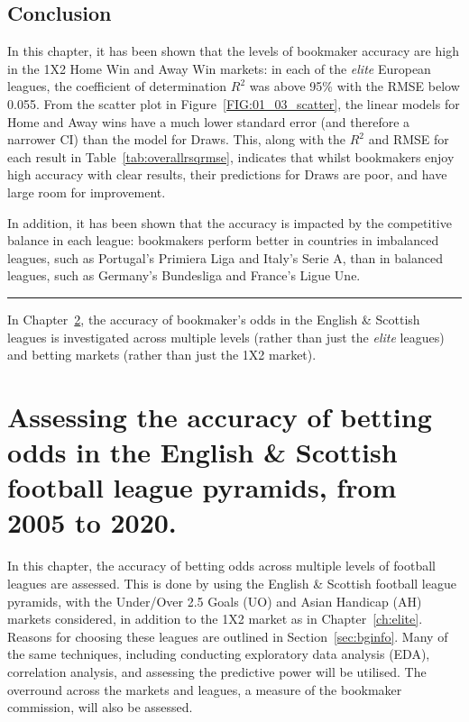 \documentclass[a4paper,10pt]{report}
\begin{document}
\section{Conclusion}\label{sec:eliteconclusion}
In this chapter, it has been shown that the levels of bookmaker accuracy are high in the 1X2 Home Win and Away Win markets: in each of the \textit{elite} European leagues, the coefficient of determination $R^2$ was above 95\% with the RMSE below 0.055. From the scatter plot in Figure~\ref{FIG:01_03_scatter}, the linear models for Home and Away wins have a much lower standard error (and therefore a narrower CI) than the model for Draws. This, along with the $R^2$ and RMSE for each result in Table~\ref{tab:overallrsqrmse}, indicates that whilst bookmakers enjoy high accuracy with clear results, their predictions for Draws are poor, and have large room for improvement.\vspace{3mm}

In addition, it has been shown that the accuracy is impacted by the competitive balance in each league: bookmakers perform better in countries in imbalanced leagues, such as Portugal's Primiera Liga and Italy's Serie A, than in balanced leagues, such as Germany's Bundesliga and France's Ligue Une. \vspace{3mm}

\begin{center}\noindent\rule{0.5\textwidth}{0.6pt}\end{center}

In Chapter~\ref{ch:ensco}, the accuracy of bookmaker's odds in the English \& Scottish leagues is investigated across multiple levels (rather than just the \textit{elite} leagues) and betting markets (rather than just the 1X2 market). 


\chapter[English \& Scottish Leagues, 2005--20]{Assessing the accuracy of betting odds in the English \& Scottish football league pyramids, from 2005 to 2020.}\label{ch:ensco}

In this chapter, the accuracy of betting odds across multiple levels of football leagues are assessed. This is done by using the English \& Scottish football league pyramids, with the Under/Over 2.5 Goals (UO) and Asian Handicap (AH) markets considered, in addition to the 1X2 market as in Chapter~\ref{ch:elite}. Reasons for choosing these leagues are outlined in Section~\ref{sec:bginfo}. Many of the same techniques, including conducting exploratory data analysis (EDA), correlation analysis, and assessing the predictive power will be utilised. The overround across the markets and leagues, a measure of the bookmaker commission, will also be assessed.
\end{document}
